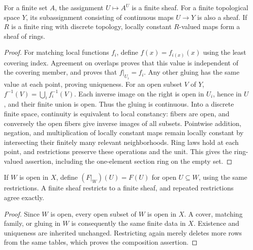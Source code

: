 \begin{proposition}
For a finite set $A$, the assignment $U\mapsto A^U$ is a finite sheaf.
For a finite topological space $Y$, its subassignment consisting of
continuous maps $U\to Y$ is also a sheaf.  If $R$ is a finite ring with
discrete topology, locally constant $R$-valued maps form a sheaf of rings.
\end{proposition}
\begin{proof}
For matching local functions $f_i$, define $f(x)=f_{i(x)}(x)$ using the
least covering index.  Agreement on overlaps proves that this value is
independent of the covering member, and proves that $f|_{U_i}=f_i$.
Any other gluing has the same value at each point, proving uniqueness.
For an open subset $V$ of $Y$,
$f^{-1}(V)=\bigcup_i f_i^{-1}(V)$.  Each inverse image on the right is
open in $U_i$, hence in $U$, and their finite union is open.  Thus the
gluing is continuous.  Into a discrete finite space, continuity is
equivalent to local constancy: fibers are open, and conversely the open
fibers give inverse images of all subsets.  Pointwise addition, negation,
and multiplication of locally constant maps remain locally constant
by intersecting their finitely many relevant neighborhoods.  Ring laws
hold at each point, and restrictions preserve these operations and the
unit.  This gives the ring-valued assertion, including the one-element
section ring on the empty set.
\end{proof}

\begin{proposition}
If $W$ is open in $X$, define $(F|_W)(U)=F(U)$ for open $U\subseteq W$,
using the same restrictions.  A finite sheaf restricts to a finite sheaf,
and repeated restrictions agree exactly.
\end{proposition}
\begin{proof}
Since $W$ is open, every open subset of $W$ is open in $X$.  A cover,
matching family, or gluing in $W$ is consequently the same finite data
in $X$.  Existence and uniqueness are inherited unchanged.  Restricting
again merely deletes more rows from the same tables, which proves the
composition assertion.
\end{proof}

